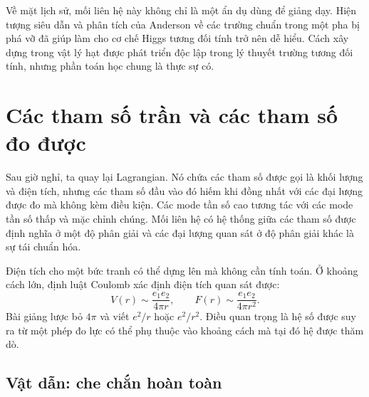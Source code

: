 \begin{classroomqa}
\end{classroomqa}

Về mặt lịch sử, mối liên hệ này không chỉ là một ẩn dụ dùng để giảng dạy. Hiện tượng siêu dẫn và phân tích của Anderson về các trường chuẩn trong một pha bị phá vỡ đã giúp làm cho cơ chế Higgs tương đối tính trở nên dễ hiểu. Cách xây dựng trong vật lý hạt được phát triển độc lập trong lý thuyết trường tương đối tính, nhưng phần toán học chung là thực sự có.

\section{Các tham số trần và các tham số đo được}

Sau giờ nghỉ, ta quay lại Lagrangian. Nó chứa các tham số được gọi là khối lượng và điện tích, nhưng các tham số đầu vào đó hiếm khi đồng nhất với các đại lượng được đo mà không kèm điều kiện. Các mode tần số cao tương tác với các mode tần số thấp và mặc chỉnh chúng. Mối liên hệ có hệ thống giữa các tham số được định nghĩa ở một độ phân giải và các đại lượng quan sát ở độ phân giải khác là sự tái chuẩn hóa.

Điện tích cho một bức tranh có thể dựng lên mà không cần tính toán. Ở khoảng cách lớn, định luật Coulomb xác định điện tích quan sát được:
\begin{equation}
  V(r)\sim\frac{e_1e_2}{4\pi r},
  \qquad
  F(r)\sim\frac{e_1e_2}{4\pi r^2}.
  \label{eq:l10-coulomb-law}
\end{equation}
Bài giảng lược bỏ \(4\pi\) và viết \(e^2/r\) hoặc \(e^2/r^2\).
Điều quan trọng là hệ số được suy ra từ một phép đo lực có thể phụ thuộc vào khoảng cách mà tại đó hệ được thăm dò.

\subsection{Vật dẫn: che chắn hoàn toàn}

